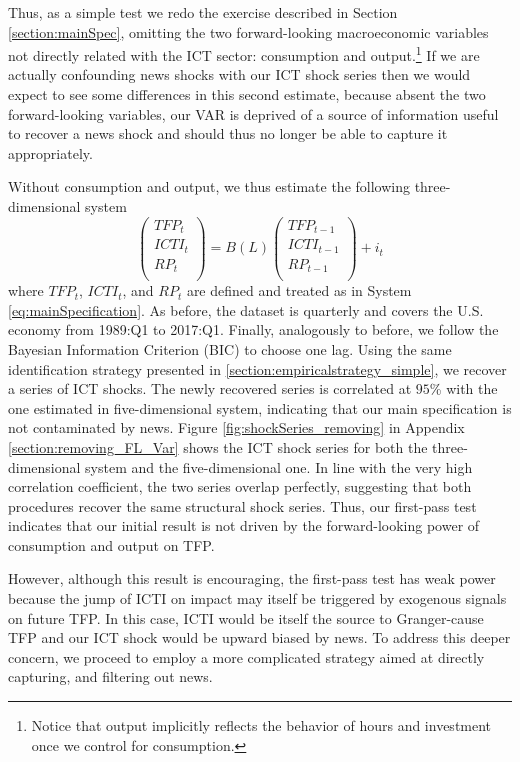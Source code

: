 \documentclass[12pt]{article}
\begin{document}
Thus, as a simple test we redo the exercise described in Section \ref{section:mainSpec}, omitting the two forward-looking macroeconomic variables not directly related with the ICT sector: consumption and output.\footnote{Notice that output implicitly reflects the behavior of hours and investment once we control for consumption.} If we are actually confounding news shocks with our ICT shock series then we would expect to see some differences in this second estimate, because absent the two forward-looking variables, our VAR is deprived of a source of information useful to recover a news shock and should thus no longer be able to capture it appropriately.

Without consumption and output, we thus estimate the following three-dimensional system
\begin{equation}\label{eq:noForVariables}
\begin{pmatrix}
TFP_t \\ 
ICTI_t \\
RP_t \\
\end{pmatrix} = B(L) \begin{pmatrix}
TFP_{t-1} \\ 
ICTI_{t-1} \\
RP_{t-1} \\
\end{pmatrix} + i_t
\end{equation}
where  $TFP_t$, $ICTI_{t}$, and $RP_t$ are defined and treated as in System \ref{eq:mainSpecification}. As before, the dataset is quarterly and covers the U.S. economy from 1989:Q1 to 2017:Q1. Finally, analogously to before, we follow the Bayesian Information Criterion (BIC) to choose one lag. Using the same identification strategy presented in \ref{section:empiricalstrategy_simple}, we recover a series of ICT shocks. The newly recovered series is correlated at $95$\% with the one estimated in five-dimensional system, indicating that our main specification is not contaminated by news. Figure \ref{fig:shockSeries_removing} in Appendix \ref{section:removing_FL_Var} shows the ICT shock series for both the three-dimensional system and the five-dimensional one. In line with the very high correlation coefficient, the two series overlap perfectly, suggesting that both procedures recover the same structural shock series. Thus, our first-pass test indicates that our initial result is not driven by the forward-looking power of consumption and output on TFP. 

However, although this result is encouraging, the first-pass test has weak power because the jump of ICTI on impact may itself be triggered by exogenous signals on future TFP. In this case, ICTI would be itself the source to Granger-cause TFP and our ICT shock would be upward biased by news. To address this deeper concern, we proceed to employ a more complicated strategy aimed at directly capturing, and filtering out news. 
\end{document}
